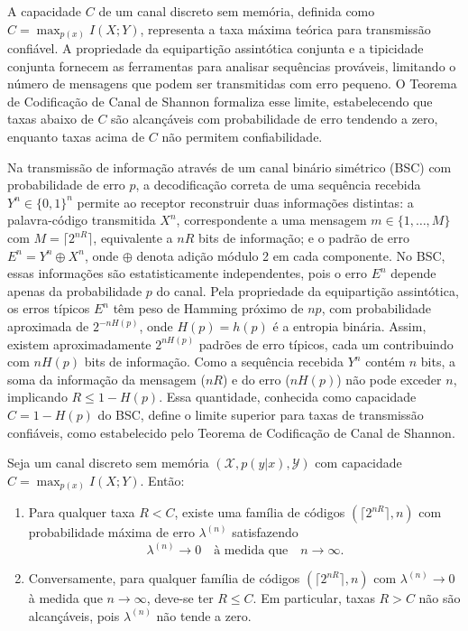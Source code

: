 A capacidade $C$ de um canal discreto sem memória, definida como 
$C = \max_{p(x)} I(X;Y)$, representa a taxa máxima teórica para transmissão
confiável. A propriedade da equipartição assintótica conjunta e a tipicidade
conjunta fornecem as ferramentas para analisar sequências prováveis, limitando
o número de mensagens que podem ser transmitidas com erro pequeno. O
Teorema de Codificação de Canal de Shannon formaliza esse limite,
estabelecendo que taxas abaixo de $C$ são alcançáveis com probabilidade de erro
tendendo a zero, enquanto taxas acima de $C$ não permitem confiabilidade.

Na transmissão de informação através de um canal binário simétrico (BSC) com
probabilidade de erro $p$, a decodificação correta de uma
sequência recebida $Y^n \in \{0,1\}^n$ permite ao receptor reconstruir duas
informações distintas: a palavra-código transmitida $X^n$, correspondente a uma
mensagem $m \in \{1, \ldots, M\}$ com $M = \lceil 2^{nR} \rceil$, equivalente a
$nR$ bits de informação; e o padrão de erro $E^n = Y^n \oplus X^n$, onde
$\oplus$ denota adição módulo 2 em cada componente. No BSC, essas informações
são estatisticamente independentes, pois o erro $E^n$ depende apenas da
probabilidade $p$ do canal. Pela propriedade da equipartição assintótica, os
erros típicos $E^n$ têm peso de Hamming próximo de $np$, com probabilidade
aproximada de $2^{-n H(p)}$, onde $H(p) = h(p)$
é a entropia binária. Assim, existem aproximadamente $2^{n H(p)}$ padrões de
erro típicos, cada um contribuindo com $n H(p)$ bits de informação. Como a
sequência recebida $Y^n$ contém $n$ bits, a soma da informação da mensagem
($nR$) e do erro ($n H(p)$) não pode exceder $n$, implicando $R \leq 1 -
H(p)$. Essa quantidade, conhecida como capacidade $C = 1 - H(p)$ do BSC,
define o limite superior para taxas de transmissão confiáveis, como
estabelecido pelo Teorema de Codificação de Canal de Shannon.

\begin{theorem}
Seja um canal discreto sem memória $(\mathcal{X}, p(y|x), \mathcal{Y})$ com capacidade $C = \max_{p(x)} I(X;Y)$. Então:
\begin{enumerate}
    \item Para qualquer taxa $R < C$, existe uma família de códigos $(\lceil 2^{nR} \rceil, n)$ com probabilidade máxima de erro $\lambda^{(n)}$ satisfazendo
      \begin{equation}
      \lambda^{(n)} \to 0 \quad \text{à medida que} \quad n \to \infty.
      \end{equation}
    \item Conversamente, para qualquer família de códigos $(\lceil 2^{nR} \rceil, n)$ com $\lambda^{(n)} \to 0$ 
      à medida que $n \to \infty$, deve-se ter $R \leq C$. Em particular, taxas $R > C$ não são alcançáveis, pois $\lambda^{(n)}$ não tende a zero.
\end{enumerate}
\end{theorem}


